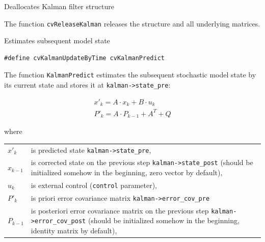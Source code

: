 \label{ReleaseKalman}

Deallocates Kalman filter structure


\begin{description}
\end{description}

The function \texttt{cvReleaseKalman} releases the structure  and all underlying matrices.

\label{KalmanPredict}

Estimates subsequent model state

\begin{lstlisting}
#define cvKalmanUpdateByTime cvKalmanPredict
\end{lstlisting}

\begin{description}
\end{description}

The function \texttt{KalmanPredict} estimates the subsequent stochastic model state by its current state and stores it at \texttt{kalman->state\_pre}:

\[
\begin{array}{l}
x'_k=A \cdot x_k+B \cdot u_k\\
P'_k=A \cdot P_{k-1}+A^T + Q
\end{array}
\]

where

\begin{tabular}{l p{5 in}}
$x'_k$ & is predicted state \texttt{kalman->state\_pre},\\
$x_{k-1}$ & is corrected state on the previous step \texttt{kalman->state\_post}
                (should be initialized somehow in the beginning, zero vector by default),\\
$u_k$ & is external control (\texttt{control} parameter),\\
$P'_k$ & is priori error covariance matrix \texttt{kalman->error\_cov\_pre}\\
$P_{k-1}$ & is posteriori error covariance matrix on the previous step \texttt{kalman->error\_cov\_post}
                (should be initialized somehow in the beginning, identity matrix by default),
\end{tabular}

